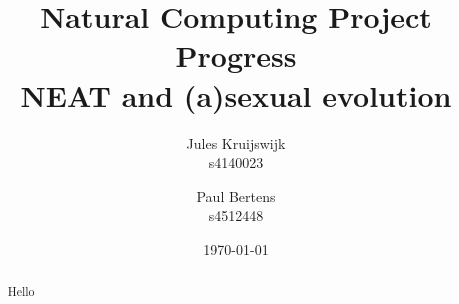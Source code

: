 \documentclass[titlepage, 12pt]{article}
\title{Natural Computing Project Progress \\ \large NEAT and (a)sexual evolution}
\author{Jules Kruijswijk \\ s4140023 \and Paul Bertens \\ s4512448}
\date{\today}
\begin{document}
\maketitle

\tableofcontents

\newpage

\begin{abstract}

Hello
\end{abstract}











\end{document}
